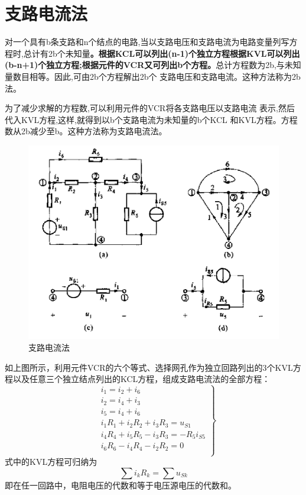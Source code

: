 \documentclass[11pt,a4paper,oneside]{book}
\begin{document}
\section{支路电流法}
对一个具有b条支路和n个结点的电路,当以支路电压和支路电流为电路变量列写方程时,总计有2b个未知量\textbf{。根据KCL可以列出(n-1)个独立方程根据KVL可以列出(b-n+1)个独立方程;根据元件的VCR又可列出b个方程。}总计方程数为2b,与未知量数目相等。因此,可由2b个方程解出2b个
支路电压和支路电流。这种方法称为2b法。

为了减少求解的方程数,可以利用元件的VCR将各支路电压以支路电流
表示,然后代入KVL方程,这样,就得到以b个支路电流为未知量的b个KCL
和KVL方程。方程数从2b减少至b。这种方法称为支路电流法。

\begin{figure}[H]
	\centering
	\includegraphics[width=0.7\linewidth]{screenshot037}
	\caption{支路电流法}
	\label{fig:screenshot037}
\end{figure}

如上图所示，利用元件VCR的六个等式、选择网孔作为独立回路列出的3个KVL方程以及任意三个独立结点列出的KCL方程，组成支路电流法的全部方程：
\begin{equation}
	\left.
	\begin{aligned}
		&i_1=i_2+i_6 \\
		&i_2=i_4+i_3 \\
		&i_5=i_4+i_6 \\
		&i_1R_1+i_2R_2+i_3R_3=u_{S1} \\
		&i_4R_4+i_5R_5-i_3R_3=-R_5i_{S5} \\
		&i_6R_6-i_4R_4-i_2R_2=0 \\
	\end{aligned}
	\right\}
\end{equation}
式中的KVL方程可归纳为
\begin{equation}
	\sum i_kR_k=\sum u_{Sk}
\end{equation}
即在任一回路中，电阻电压的代数和等于电压源电压的代数和。
\end{document}
